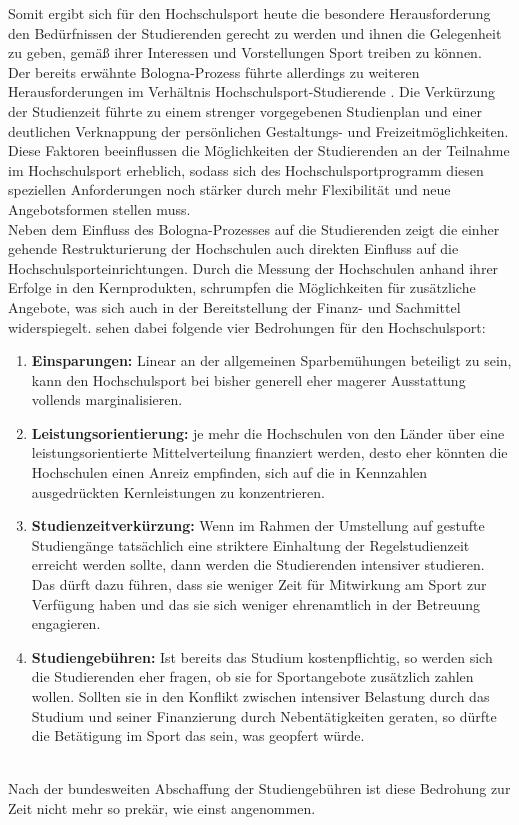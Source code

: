 Somit ergibt sich für den Hochschulsport heute die besondere Herausforderung den Bedürfnissen der Studierenden gerecht zu werden und ihnen die Gelegenheit zu geben, gemäß ihrer Interessen und Vorstellungen Sport treiben zu können. \\
Der bereits erwähnte Bologna-Prozess führte allerdings zu weiteren Herausforderungen im Verhältnis Hochschulsport-Studierende \cite[vgl. ][S.7]{Berthold.2007}. Die Verkürzung der Studienzeit führte zu einem strenger vorgegebenen Studienplan und einer deutlichen Verknappung der persönlichen Gestaltungs- und Freizeitmöglichkeiten. Diese Faktoren beeinflussen die Möglichkeiten der Studierenden an der Teilnahme im Hochschulsport erheblich, sodass sich des Hochschulsportprogramm diesen speziellen Anforderungen noch stärker durch mehr Flexibilität und neue Angebotsformen stellen muss.
\\
Neben dem Einfluss des Bologna-Prozesses auf die Studierenden zeigt die einher gehende Restrukturierung der Hochschulen auch direkten Einfluss auf die Hochschulsporteinrichtungen. Durch die Messung der Hochschulen anhand ihrer Erfolge in den Kernprodukten, schrumpfen die Möglichkeiten für zusätzliche Angebote, was sich auch in der Bereitstellung der Finanz- und Sachmittel widerspiegelt. \citeauthor{Berthold.2007} sehen dabei folgende vier Bedrohungen für den Hochschulsport:
\begin{enumerate}
\item \textbf{Einsparungen:} Linear an der allgemeinen Sparbemühungen beteiligt zu sein, kann den Hochschulsport bei bisher generell eher magerer Ausstattung vollends marginalisieren.
\item \textbf{Leistungsorientierung:} je mehr die Hochschulen von den Länder über eine leistungsorientierte Mittelverteilung finanziert werden, desto eher könnten die Hochschulen einen Anreiz empfinden, sich auf die in Kennzahlen ausgedrückten Kernleistungen zu konzentrieren.
\item \textbf{Studienzeitverkürzung:} Wenn im Rahmen der Umstellung auf gestufte Studiengänge tatsächlich eine striktere Einhaltung der Regelstudienzeit erreicht werden sollte, dann werden die Studierenden intensiver studieren. Das dürft dazu führen, dass sie weniger Zeit für Mitwirkung am Sport zur Verfügung haben und das sie sich weniger ehrenamtlich in der Betreuung engagieren.
\item \textbf{Studiengebühren:} Ist bereits das Studium kostenpflichtig, so werden sich die Studierenden eher fragen, ob sie for Sportangebote zusätzlich zahlen wollen. Sollten sie in den Konflikt zwischen intensiver Belastung durch das Studium und seiner Finanzierung durch Nebentätigkeiten geraten, so dürfte die Betätigung im Sport das sein, was geopfert würde.
\end{enumerate}
\cite[siehe ][S.16]{Berthold.2007}
\\
Nach der bundesweiten Abschaffung der Studiengebühren ist diese Bedrohung zur Zeit nicht mehr so prekär, wie einst angenommen.

